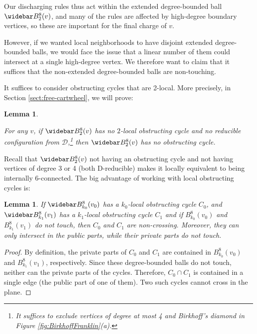 \documentclass[10pt,a4paper]{article}
\newtheorem{lem}[thm]{Lemma}
\renewcommand{\bar}{\widebar}
\newcommand{\carsten}[1]{\textbf{\textcolor{orange}{{C: } #1}}}
\def\cD{{\mathcal D}}
\def\showlabel#1{}
\begin{document}
Our discharging rules thus act within the extended degree-bounded ball $\bar B_2^8(v)$, and many of the rules are affected by high-degree boundary vertices, so these are important for the final charge of $v$.

However, if we wanted local neighborhoods to have disjoint extended degree-bounded balls, we would face the issue that a linear number of them could intersect at a single high-degree vertex.
We therefore want to claim that it suffices that the non-extended degree-bounded balls are non-touching.

It suffices to consider obstructing cycles that are 2-local. 
More precisely, in Section \ref{sect:free-cartwheel}, 
we will prove:

\begin{lem}\label{lem:pre-cartwheel} 
\showlabel{lem:pre-cartwheel}
For any $v$, if $\bar B^8_2(v)$ has no $2$-local obstructing cycle and no reducible configuration from $\cD$,\footnote{It suffices to exclude vertices of degree at most 4 and Birkhoff's diamond in Figure \ref{fig:BirkhoffFranklin}(a).} then $\bar B^8_2(v)$ has no obstructing cycle.
\end{lem}


Recall that $\bar B^8_2(v)$ not having an obstructing cycle and not having vertices of degree 3 or 4 (both D-reducible) makes it locally equivalent to being
internally 6-connected. 
The big advantage of working with local obstructing cycles is:

\begin{lem}\label{lem:non-crossing}\showlabel{lem:non-crossing}
    If $\bar B_{k_0}^8(v_0)$ has a 
    $k_0$-local obstructing cycle $C_0$, and $\bar B_{k_1}^8(v_1)$ has a $k_1$-local obstructing cycle $C_1$ and
    if $B_{k_0}^8(v_0)$ and $B_{k_1}^8(v_1)$ do not touch, then $C_0$ and $C_1$ are non-crossing. Moreover, they can only intersect in the public parts, while their private parts do not touch.
\end{lem}

\begin{proof}
   By definition, the private parts of $C_0$ and $C_1$ are contained in
   $B_{k_0}^8(v_0)$ and $B_{k_1}^8(v_1)$, respectively. Since these degree-bounded balls do not touch, neither can the private parts of the cycles. Therefore, $C_0\cap C_1$ is contained in a single edge (the public part of one of them). Two such cycles cannot cross in the plane.
\end{proof}
\end{document}
